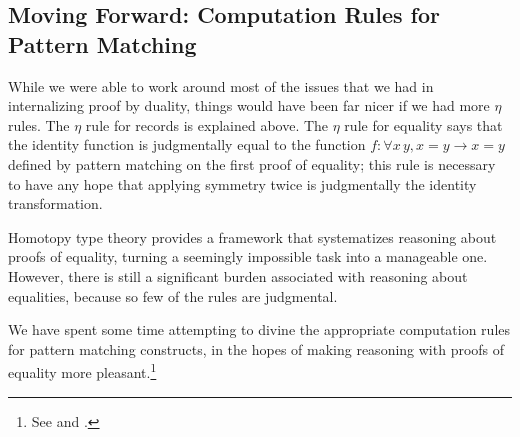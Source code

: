   \subsection{Moving Forward: Computation Rules for Pattern Matching} \label{sec:compute-match}
    While we were able to work around most of the issues that we had in internalizing proof by duality, things would have been far nicer if we had more $\eta$ rules.
    The $\eta$ rule for records is explained above.
    The $\eta$ rule for equality says that the identity function is judgmentally equal to the function $f : \forall x\, y, x = y \to x = y$ defined by pattern matching on the first proof of equality; this rule is necessary to have any hope that applying symmetry twice is judgmentally the identity transformation.

    Homotopy type theory provides a framework that systematizes reasoning about proofs of equality, turning a seemingly impossible task into a manageable one.
    However, there is still a significant burden associated with reasoning about equalities, because so few of the rules are judgmental.

    We have spent some time attempting to divine the appropriate computation rules for pattern matching constructs, in the hopes of making reasoning with proofs of equality more pleasant.\footnote{See  and .}


